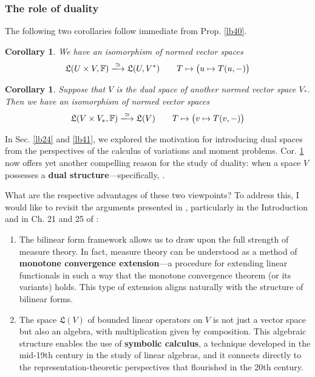 \documentclass[12pt,b5paper,notitlepage]{article}
\theoremstyle{definition}
\theoremstyle{plain}
\newtheorem{co}[df]{Corollary}
\newcommand{\fk}{\mathfrak}
\newcommand{\Fbb}{\mathbb F}
\numberwithin{equation}{section}
\begin{document}
\subsubsection{The role of duality}\label{lb132}


The following two corollaries follow immediate from Prop. \ref{lb40}.

\begin{co}\label{lb134}
We have an isomorphism of normed vector spaces
\begin{gather}
\fk L(U\times V,\Fbb)\xlongrightarrow{\simeq}\fk L(U,V^*)\qquad T\mapsto\big(u\mapsto T(u,-)\big)
\end{gather}
\end{co}


\begin{co}\label{lb42}
Suppose that $V$ is the dual space of another normed vector space $V_*$. Then we have an isomorphism of normed vector spaces
\begin{gather}
\fk L(V\times V_*,\Fbb)\xlongrightarrow{\simeq}\fk L(V)\qquad T\mapsto\big(v\mapsto T(v,-)\big)
\end{gather}
\end{co}


In Sec. \ref{lb24} and \ref{lb41}, we explored the motivation for introducing dual spaces from the perspectives of the calculus of variations and moment problems. Cor. \ref{lb42} now offers yet another compelling reason for the study of duality: when a space $V$ possesses a \textbf{dual structure}---specifically, . 

What are the respective advantages of these two viewpoints? To address this, I would like to revisit the arguments presented in \cite{Gui-A}, particularly in the Introduction and in Ch. 21 and 25 of \cite{Gui-A}:


\begin{enumerate}
\item The bilinear form framework allows us to draw upon the full strength of measure theory. In fact, measure theory can be understood as a method of \textbf{monotone convergence extension}---a procedure for extending linear functionals in such a way that the monotone convergence theorem (or its variants) holds.  This type of extension aligns naturally with the structure of bilinear forms.
\item The space $\fk L(V)$ of bounded linear operators on $V$ is not just a vector space but also an algebra, with multiplication given by composition. This algebraic structure enables the use of \textbf{symbolic calculus}, a technique developed in the mid-19th century in the study of linear algebras, and it connects directly to the representation-theoretic perspectives that flourished in the 20th century.
\end{enumerate}
\end{document}
